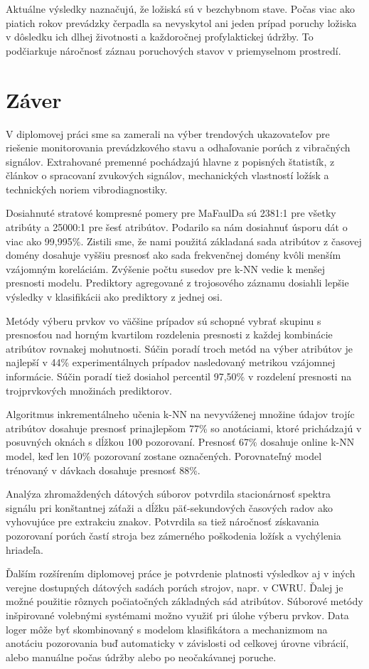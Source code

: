 Aktuálne výsledky naznačujú, že ložiská sú v bezchybnom stave. Počas viac ako piatich rokov prevádzky čerpadla sa nevyskytol ani jeden prípad poruchy ložiska v dôsledku ich dlhej životnosti a každoročnej profylaktickej údržby. To podčiarkuje náročnosť záznau poruchových stavov v priemyselnom prostredí. 

\section{Záver}
V diplomovej práci sme sa zamerali na výber trendových ukazovateľov pre riešenie monitorovania prevádzkového stavu a odhaľovanie porúch z vibračných signálov.  Extrahované premenné pochádzajú hlavne z popisných štatistík, z článkov o spracovaní zvukových signálov, mechanických vlastností ložísk a technických noriem vibrodiagnostiky.

Dosiahnuté stratové kompresné pomery pre MaFaulDa sú 2381:1 pre všetky atribúty a 25000:1 pre šesť atribútov. Podarilo sa nám dosiahnuť úsporu dát o viac ako 99,995\%. Zistili sme, že nami použitá základaná sada atribútov z časovej domény dosahuje vyššiu presnosť ako sada frekvenčnej domény kvôli menším vzájomným koreláciám. Zvýšenie počtu susedov pre k-NN vedie k menšej presnosti modelu. Prediktory agregované z trojosového záznamu dosiahli lepšie výsledky v klasifikácii ako prediktory z jednej osi. 

Metódy výberu prvkov vo väčšine prípadov sú schopné vybrať skupinu s presnosťou nad horným kvartilom rozdelenia presnosti z každej kombinácie atribútov rovnakej mohutnosti. Súčin poradí troch metód na výber atribútov je najlepší v 44\% experimentálnych prípadov nasledovaný metrikou vzájomnej informácie. Súčin poradí tiež dosiahol percentil 97,50\% v rozdelení presnosti na trojprvkových množinách prediktorov.

Algoritmus inkrementálneho učenia k-NN na nevyváženej množine údajov trojíc atribútov dosahuje presnosť prinajlepšom 77\% so anotáciami, ktoré prichádzajú v posuvných oknách s dĺžkou 100 pozorovaní. Presnosť 67\% dosahuje online k-NN model, keď len 10\% pozorovaní zostane označených. Porovnateľný model trénovaný v dávkach dosahuje presnosť 88\%.

Analýza zhromaždených dátových súborov potvrdila stacionárnosť spektra signálu pri konštantnej záťaži a dĺžku päť-sekundových časových radov ako vyhovujúce pre extrakciu znakov. Potvrdila sa tiež náročnosť získavania pozorovaní porúch častí stroja bez zámerného poškodenia ložísk a vychýlenia hriadeľa.

Ďalším rozšírením diplomovej práce je potvrdenie platnosti výsledkov aj v iných verejne dostupných dátových sadách porúch strojov, napr. v CWRU. Ďalej je možné použitie rôznych počiatočných základných sád atribútov. Súborové metódy inšpirované volebnými systémami možno využiť pri úlohe výberu prvkov. Data loger môže byť skombinovaný s modelom klasifikátora a mechanizmom na anotáciu pozorovania buď automaticky v závislosti od celkovej úrovne vibrácií, alebo manuálne počas údržby alebo po neočakávanej poruche.
\clearpage